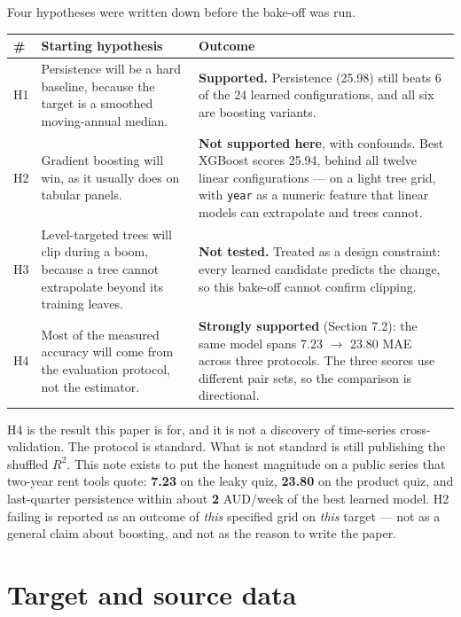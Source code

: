 \documentclass[11pt,a4paper]{article}
\begin{document}
Four hypotheses were written down before the bake-off was run.

\begin{center}
\small
\begin{tabularx}{\linewidth}{@{}l>{\raggedright\arraybackslash}X>{\raggedright\arraybackslash}X@{}}
\toprule
\# & Starting hypothesis & Outcome \\
\midrule
H1 & Persistence will be a hard baseline, because the target is a smoothed moving-annual median. & \textbf{Supported.} Persistence (25.98) still beats 6 of the 24 learned configurations, and all six are boosting variants. \\
H2 & Gradient boosting will win, as it usually does on tabular panels. & \textbf{Not supported here}, with confounds. Best XGBoost scores 25.94, behind all twelve linear configurations --- on a light tree grid, with \texttt{year} as a numeric feature that linear models can extrapolate and trees cannot. \\
H3 & Level-targeted trees will clip during a boom, because a tree cannot extrapolate beyond its training leaves. & \textbf{Not tested.} Treated as a design constraint: every learned candidate predicts the change, so this bake-off cannot confirm clipping. \\
H4 & Most of the measured accuracy will come from the evaluation protocol, not the estimator. & \textbf{Strongly supported} (Section 7.2): the same model spans 7.23 $\rightarrow$ 23.80 MAE across three protocols. The three scores use different pair sets, so the comparison is directional. \\
\bottomrule
\end{tabularx}
\end{center}

H4 is the result this paper is for, and it is not a discovery of time-series cross-validation. The protocol is standard. What is not standard is still publishing the shuffled \(R^2\). This note exists to put the honest magnitude on a public series that two-year rent tools quote: \textbf{7.23} on the leaky quiz, \textbf{23.80} on the product quiz, and last-quarter persistence within about \textbf{2} AUD/week of the best learned model. H2 failing is reported as an outcome of \emph{this} specified grid on \emph{this} target --- not as a general claim about boosting, and not as the reason to write the paper.

\section{Target and source data}
\end{document}
